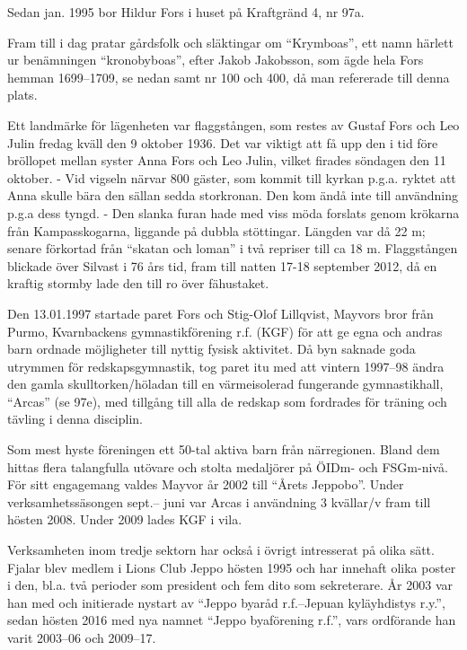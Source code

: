 Sedan jan. 1995 bor Hildur Fors i huset på Kraftgränd 4, nr 97a.


Fram till i dag pratar gårdsfolk och släktingar om ``Krymboas'', ett namn härlett ur benämningen ``kronobyboas'', efter Jakob Jakobsson, som ägde hela Fors hemman 1699--1709, se nedan samt nr 100 och 400, då man refererade till denna plats.

Ett landmärke för lägenheten var flaggstången, som restes av Gustaf	Fors och Leo Julin fredag kväll den 9 oktober 1936. Det var viktigt att få upp den i tid före bröllopet mellan syster Anna Fors och Leo Julin, vilket firades söndagen den 11 oktober. - Vid vigseln närvar 800	gäster, som kommit till kyrkan p.g.a. ryktet att Anna skulle bära den	sällan sedda storkronan. Den kom ändå inte till användning p.g.a	dess tyngd. - Den slanka furan hade med viss möda forslats genom	krökarna från Kampasskogarna, liggande på dubbla stöttingar. Längden var då 22 m; senare förkortad från ``skatan och loman''  i två	repriser till ca 18 m. Flaggstången blickade över Silvast i 76 års tid,	fram till natten 17-18 september 2012, då en kraftig stormby lade den till ro över fähustaket.

Den 13.01.1997 startade paret Fors och Stig-Olof Lillqvist, Mayvors	bror från Purmo, Kvarnbackens gymnastikförening r.f. (KGF) för att ge	egna och andras barn ordnade möjligheter till nyttig fysisk aktivitet. Då byn saknade goda utrymmen för redskapsgymnastik, tog paret itu med att vintern 1997--98 ändra den gamla	skulltorken/höladan till en värmeisolerad fungerande gymnastikhall,	``Arcas'' (se 97e), med tillgång till alla de redskap som fordrades för träning och tävling i denna disciplin.


Som mest hyste föreningen ett 50-tal aktiva barn från närregionen. Bland dem hittas flera talangfulla utövare och stolta medaljörer på ÖIDm- och FSGm-nivå. För sitt engagemang valdes Mayvor år 2002 till ``Årets Jeppobo''. Under verksamhetssäsongen sept.-- juni var Arcas i användning 3 kvällar/v fram till hösten 2008. Under 2009 lades KGF i vila.

Verksamheten inom tredje sektorn har också i övrigt intresserat på olika sätt. Fjalar blev medlem i Lions Club Jeppo hösten 1995 och har innehaft olika poster i den, bl.a. två perioder som president och fem dito som sekreterare. År 2003 var han med och initierade	nystart av ``Jeppo byaråd r.f.--Jepuan kyläyhdistys r.y.'', sedan hösten 2016 med nya namnet ``Jeppo byaförening r.f.'', vars ordförande han varit 2003--06 och 2009--17.

